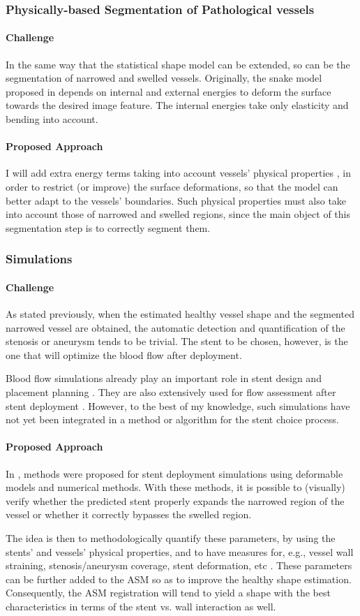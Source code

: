 \documentclass[a4paper]{article}
\newcommand{\challenge}{\paragraph{Challenge}}
\newcommand{\approach}{\paragraph{Proposed Approach}}
\newcommand{\citep}{\cite}
\begin{document}
\subsubsection{Physically-based Segmentation of Pathological vessels}

\challenge
In the same way that the statistical shape model can be extended, so can be the segmentation of narrowed and swelled vessels. Originally, the snake model proposed in \citep{Kass} depends on internal and external energies to deform the surface towards the desired image feature. The internal energies take only elasticity and bending into account. 

\approach
I will add extra energy terms taking into account vessels' physical properties \citep{BOUS-09c,ZAHN-11d}, in order to restrict (or improve) the surface deformations, so that the model can better adapt to the vessels' boundaries. Such physical properties must also take into account those of narrowed and swelled regions, since the main object of this segmentation step is to correctly segment them.

\subsubsection{Simulations}

\challenge
As stated previously, when the estimated healthy vessel shape and the segmented narrowed vessel are obtained, the automatic detection and quantification of the stenosis or aneurysm tends to be trivial. The stent to be chosen, however, is the one that will optimize the blood flow after deployment. 

Blood flow simulations already play an important role in stent design and placement planning \citep{deBeule,ATTI-08}. They are also extensively used for flow assessment after stent deployment \citep{Vuk,Gori}. However, to the best of my knowledge, such simulations have not yet been integrated in a method or algorithm for the stent choice process. 

\approach
In \citep{Florez,deBeule}, methods were proposed for stent deployment simulations using deformable models and numerical methods. With these methods, it is possible to (visually) verify whether the predicted stent properly expands the narrowed region of the vessel or whether it correctly bypasses the swelled region. 

The idea is then to methodologically quantify these parameters, by using the stents' and vessels' physical properties, and to have measures for, e.g., vessel wall straining, stenosis/aneurysm coverage, stent deformation, etc \citep{BOUS-09c,BOUS-08c,SULA-08a}. These parameters can be further added to the ASM so as to improve the healthy shape estimation. Consequently, the ASM registration will tend to yield a shape with the best characteristics in terms of the stent vs. wall interaction as well.
\end{document}
